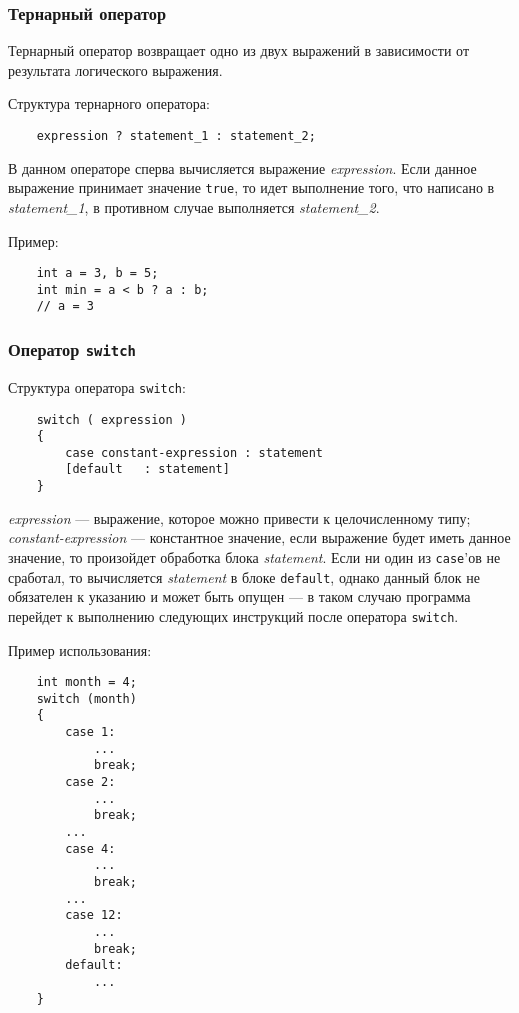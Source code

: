 \subsubsection{Тернарный оператор}
\label{subsubsec:ternaryOperator}
Тернарный оператор возвращает одно из двух выражений в зависимости от результата логического выражения.

Структура тернарного оператора:

\begin{lstlisting}
    expression ? statement_1 : statement_2;
\end{lstlisting}

В данном операторе сперва вычисляется выражение \textit{expression}. Если данное выражение принимает значение \lstinline|true|, то идет выполнение того, что написано в \textit{statement\_1}, в противном случае выполняется \textit{statement\_2}.

Пример:
\begin{lstlisting}
    int a = 3, b = 5;
    int min = a < b ? a : b;
    // a = 3
\end{lstlisting}

\subsubsection{Оператор \texttt{switch}}
Структура оператора \lstinline|switch|:
\begin{lstlisting}
    switch ( expression )
    {
        case constant-expression : statement
        [default   : statement]
    }
\end{lstlisting}

\textit{expression} --- выражение, которое можно привести к целочисленному типу; \textit{constant-expression} --- константное значение, если выражение будет иметь данное значение, то произойдет обработка блока \textit{statement}. Если ни один из \lstinline|case|'ов не сработал, то вычисляется \textit{statement} в блоке \lstinline|default|, однако данный блок не обязателен к указанию и может быть опущен --- в таком случаю программа перейдет к выполнению следующих инструкций после оператора \lstinline|switch|.

Пример использования:
\begin{lstlisting}
    int month = 4;
    switch (month)
    {
        case 1:
            ...
            break;
        case 2:
            ...
            break;
        ...
        case 4:
            ...
            break;
        ...
        case 12:
            ...
            break;
        default:
            ...
    }
\end{lstlisting}

